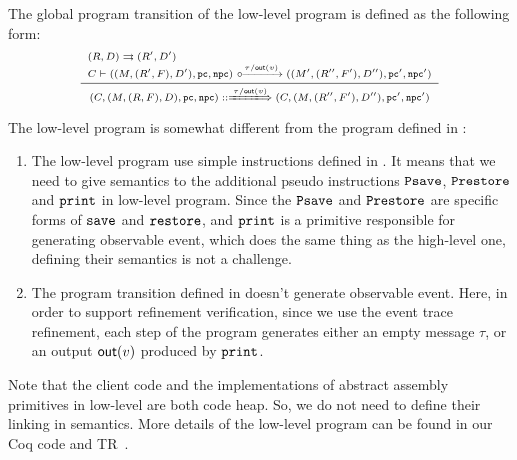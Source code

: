 The global program transition of the low-level \sparc{} program is defined 
as the following form:
\[
    \scriptsize
    \infer
    {
        \LGlobTrans{(\code, (\Mem, (\RFile, \Wstack), \DBuf), \pc, \npc)}
            { \empmsg / \outEvt{\val} }
            {(\code, (\Mem, (\RFile'', \Wstack'), \DBuf''), \pc', \npc')}
    }
    {
        \begin{array}{l}
            \Dstep{(\RFile, \DBuf)}{(\RFile', \DBuf')} \\
            \llocalstep{\code}
                {((\Mem, (\RFile', \Wstack), \DBuf'), \pc, \npc)}
                { \empmsg / \outEvt{\val} }
                {((\Mem', (\RFile'', \Wstack'), \DBuf''), \pc', \npc')}
        \end{array}
    }
\]
{\color{blue}
The low-level \sparc{} program is somewhat different 
from the \sparc{} program defined in 
\Sec{\ref{sec:modeling}}:
\begin{enumerate}
    \item The low-level \sparc{} program use simple 
        instructions defined in 
        \Fig{\ref{fig:syntax-of-concur-pseudo-sparc}}. 
        It means that we need to give semantics to the additional 
        pseudo instructions $\texttt{Psave}$, $\texttt{Prestore}$ and 
        $\texttt{print}$ in low-level \sparc{} program. 
        Since the $\texttt{Psave}$ and $\texttt{Prestore}$ 
        are specific forms of $\texttt{save}{}$ and 
        $\texttt{restore}{}$, and $\texttt{print}$ is a primitive 
        responsible for generating observable event, 
        which does the same thing as the high-level one, 
        defining their semantics is not a challenge.
    \item The program transition defined in 
        \Sec{\ref{sec:modeling}} doesn't generate 
        observable event. Here, in order to support 
        refinement verification, 
        since we use the event trace refinement, 
        each step of the program 
        generates either an empty message $\tau$, 
        or an output $\textsf{out}({v})$ produced 
        by $\texttt{print}$. 
\end{enumerate}
}
{\color{blue} Note that the client 
code and the implementations of abstract assembly primitives 
in low-level are both \sparc{} code heap. So, we do not need 
to define their linking in semantics.} 
More details of the low-level program can be found in 
our Coq code and TR~\cite{coqimp}. 

